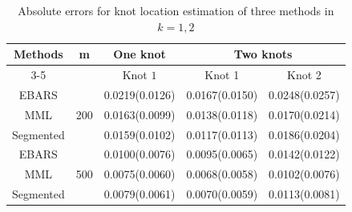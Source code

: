 

\begin{table}
\caption{Absolute errors for knot location estimation of three methods in $k=1,2$}
\label{tab:knot_1}
\centering
\begin{tabular}{ccccc}
\toprule
\multirow{2}{*}{Methods} & \multirow{2}{*}{m}   & One knot       & \multicolumn{2}{c}{Two knots}    \\
\cline{3-5}
                         &                      & Knot $1$         & Knot 1         & Knot 2         \\
                         \midrule
EBARS                    & \multirow{3}{*}{200} & 0.0219(0.0126) & 0.0167(0.0150)  & 0.0248(0.0257) \\
MML                      &                      & 0.0163(0.0099) & 0.0138(0.0118) & 0.0170(0.0214)  \\
Segmented                &                      & 0.0159(0.0102) & 0.0117(0.0113) & 0.0186(0.0204) \\
\midrule
EBARS                    & \multirow{3}{*}{500} & 0.0100(0.0076)  & 0.0095(0.0065) & 0.0142(0.0122) \\
MML                      &                      & 0.0075(0.0060)  & 0.0068(0.0058) & 0.0102(0.0076) \\
Segmented                &                      & 0.0079(0.0061) & 0.0070(0.0059)  & 0.0113(0.0081) \\
\bottomrule


\end{tabular}
\end{table}

